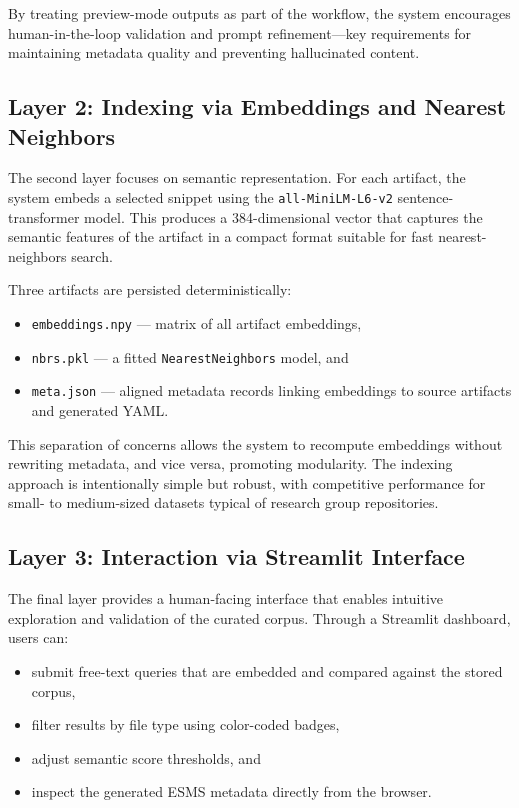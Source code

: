 \documentclass[12pt]{article}
\begin{document}
By treating preview-mode outputs as part of the workflow, the system encourages 
human-in-the-loop validation and prompt refinement—key requirements for 
maintaining metadata quality and preventing hallucinated content.

\subsection{Layer 2: Indexing via Embeddings and Nearest Neighbors}

The second layer focuses on semantic representation. For each artifact, the 
system embeds a selected snippet using the \texttt{all-MiniLM-L6-v2} 
sentence-transformer model. This produces a 384-dimensional vector that captures 
the semantic features of the artifact in a compact format suitable for fast 
nearest-neighbors search.

Three artifacts are persisted deterministically:

\begin{itemize}
    \item \texttt{embeddings.npy} — matrix of all artifact embeddings,
    \item \texttt{nbrs.pkl} — a fitted \texttt{NearestNeighbors} model, and
    \item \texttt{meta.json} — aligned metadata records linking embeddings to 
    source artifacts and generated YAML.
\end{itemize}

This separation of concerns allows the system to recompute embeddings without 
rewriting metadata, and vice versa, promoting modularity. The indexing approach 
is intentionally simple but robust, with competitive performance for small- to 
medium-sized datasets typical of research group repositories.

\subsection{Layer 3: Interaction via Streamlit Interface}

The final layer provides a human-facing interface that enables intuitive 
exploration and validation of the curated corpus. Through a Streamlit dashboard, 
users can:

\begin{itemize}
    \item submit free-text queries that are embedded and compared against the 
    stored corpus,
    \item filter results by file type using color-coded badges,
    \item adjust semantic score thresholds, and
    \item inspect the generated ESMS metadata directly from the browser.
\end{itemize}
\end{document}
